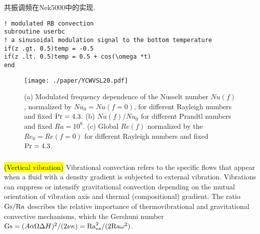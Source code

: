 \documentclass{hmj}
\newcommand\Pra{\mbox{\textrm{Pr}}} %
\newcommand\Ra{\mbox{\textrm{Ra}}} %
\newcommand\Gs{\mbox{\textrm{Gs}}} %
\begin{document}
共振调频在Nek5000中的实现.
\begin{lstlisting}
! modulated RB convection
subroutine userbc
! a sinusoidal modulation signal to the bottom temperature
if(z .gt. 0.5)temp = -0.5
if(z .lt. 0.5)temp = 0.5 + cos(\omega *t)
end
\end{lstlisting}
 
\begin{figure}
  \centering
  \centering
  \texttt{[image: ./paper/YCWVSL20.pdf]}
  \renewcommand{\figurename}{Figure}
  \caption{(a) Modulated frequency dependence of the Nusselt number $Nu( f)$, normalized by $Nu_0 = Nu( f = 0)$, for different Rayleigh numbers and fixed $\Pra = 4.3$. (b) $Nu( f)/Nu_0$ for different Prandtl numbers and fixed $Ra = 10^8$. (c) Global $Re( f)$ normalized by the $Re_0 = Re( f = 0)$ for different Rayleigh numbers and fixed $\Pra = 4.3$.}
  \renewcommand{\figurename}{图}
\label{fig2}
\end{figure}

 
\subsubsection{\cite{Bouarab2019}}

\subsubsection{\cite{Mialdun2008}}
\hl{(Vertical vibration)} Vibrational convection refers to the specific flows that appear when a fluid with a density gradient is subjected to external vibration. Vibrations can suppress or intensify gravitational convection depending on the mutual orientation of vibration axis and thermal (compositional) gradient. {\color{red} The ratio $\Gs/\Ra$ describes the relative importance of thermovibrational and gravitational convective mechanisms, which the Gershuni  number $\Gs=(A\alpha\Omega\Delta H)^2/(2\nu\kappa)=\Ra_{os}^2/(2\Ra \omega^2)$.}
\end{document}
